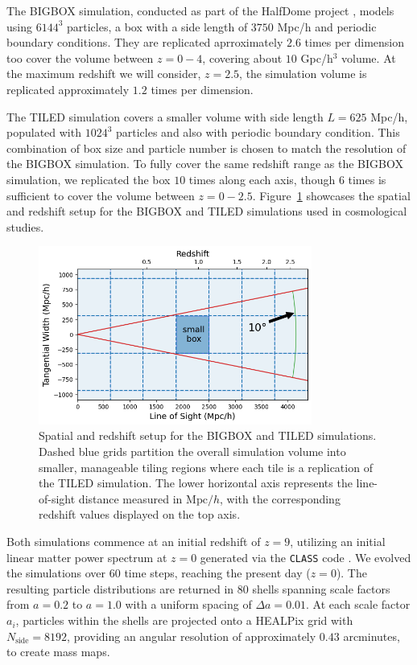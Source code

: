 The BIGBOX simulation, conducted as part of the HalfDome project \citep{2024arXiv240717462B}, models using $6144^3$ particles, a box with a side length of $3750$ Mpc/h and periodic boundary conditions.
They are replicated aprroximately $2.6$ times per dimension too cover the volume between $z = 0 - 4$, covering about $10$ Gpc/h$^3$ volume.
At the maximum redshift we will consider, $z = 2.5$, the simulation volume is replicated approximately $1.2$ times per dimension.

The TILED simulation covers a smaller volume with side length $L = 625$ Mpc/h, populated with $1024^3$ particles and also with periodic boundary condition. This combination of box size and particle number is chosen to match the resolution of the BIGBOX simulation. To fully cover the same redshift range as the BIGBOX simulation, we replicated the box $10$ times along each axis, though $6$ times is sufficient to cover the volume between $z = 0 - 2.5$. Figure~\ref{fig:simulationsetting} showcases the spatial and redshift setup for the BIGBOX and TILED simulations used in cosmological studies. 

\begin{figure}[ht]
    \centering
    \includegraphics[width=0.8\textwidth]{figures/light_cone_configuration.png}
    \caption[Spatial and redshift setup for the BIGBOX and TILED simulations]{Spatial and redshift setup for the BIGBOX and TILED simulations. Dashed blue grids partition the overall simulation volume into smaller, manageable tiling regions where each tile is a replication of the TILED simulation. The lower horizontal axis represents the line-of-sight distance measured in $\mathrm{Mpc}/h$, with the corresponding redshift values displayed on the top axis.} \label{fig:simulationsetting}
\end{figure}

Both simulations commence at an initial redshift of $z = 9$, utilizing an initial linear matter power spectrum at $z = 0$ generated via the \texttt{CLASS} code \citep{2011JCAP...07..034B}. We evolved the simulations over $60$ time steps, reaching the present day ($z = 0$). The resulting particle distributions are returned in $80$ shells spanning scale factors from $a = 0.2$ to $a = 1.0$ with a uniform spacing of $\Delta a = 0.01$. At each scale factor $a_i$, particles within the shells are projected onto a HEALPix grid \citep{Górski_2005} with $N_{\text{side}} = 8192$, providing an angular resolution of approximately $0.43$ arcminutes, to create mass maps.

